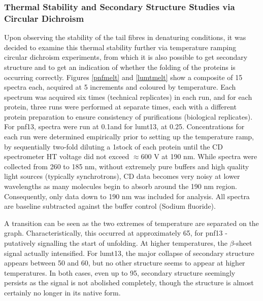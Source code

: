 \subsubsection{Thermal Stability and Secondary Structure Studies via Circular Dichroism}
Upon observing the stability of the tail fibres in denaturing conditions, it was decided to examine this thermal stability further via temperature ramping circular dichroism experiments, from which it is also possible to get secondary structure and to get an indication of whether the folding of the proteins is occurring correctly. Figures \ref{pnfmelt} and \ref{lumtmelt} show a composite of 15 spectra each, acquired at 5\degC{} increments and coloured by temperature. Each spectrum was acquired six times (technical replicates) in each run, and for each protein, three runs were performed at separate times, each with a different protein preparation to ensure consistency of purifications (biological replicates). For pnf13, spectra were run at 0.1\mgml and for lumt13, at 0.25\mgml. Concentrations for each run were determined empirically prior to setting up the temperature ramp, by sequentially two-fold diluting a 1\mgml stock of each protein until the CD spectrometer HT voltage did not exceed $\approx$600 V at 190 nm. While spectra were collected from 260 to 185 nm, without extremely pure buffers and high quality light sources (typically synchrotrons), CD data becomes very noisy at lower wavelengths as many molecules begin to absorb around the 190 nm region. Consequently, only data down to 190 nm was included for analysis. All spectra are baseline subtracted against the buffer control (Sodium fluoride).

A transition can be seen as the two extremes of temperature are separated on the graph. Characteristically, this occurred at approximately 65\degC, for pnf13 - putatively signalling the start of unfolding. At higher temperatures, the $\beta$-sheet signal actually intensified. For lumt13, the major collapse of secondary structure appears between 50 and 60\degC, but no other structure seems to appear at higher temperatures. In both cases, even up to 95\degC, secondary structure seemingly persists as the signal is not abolished completely, though the structure is almost certainly no longer in its native form.


